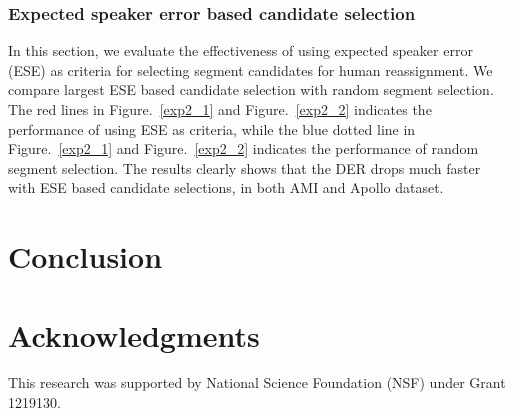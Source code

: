 \documentclass[journal]{IEEEtran}
\begin{document}
\subsubsection{Expected speaker error based candidate selection}
In this section, we evaluate the effectiveness of using expected speaker error (ESE) as criteria for selecting segment candidates for human reassignment. We compare largest ESE based candidate selection with random segment selection. The red lines in Figure.~\ref{exp2_1} and Figure.~\ref{exp2_2} indicates the performance of using ESE as criteria, while the blue dotted line in Figure.~\ref{exp2_1} and Figure.~\ref{exp2_2} indicates the performance of random segment selection. The results clearly shows that the DER drops much faster with ESE based candidate selections, in both AMI and Apollo dataset.

\section{Conclusion}

\section*{Acknowledgments}
This research was supported by National Science Foundation (NSF) under Grant 1219130.
 






\ifCLASSOPTIONcaptionsoff
  \newpage
\fi



\end{document}
